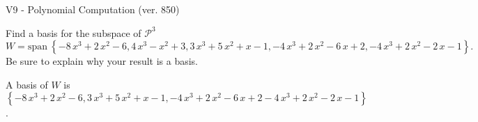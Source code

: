 \begin{exercise}
  \begin{exerciseTitle}V9 - Polynomial Computation (ver. 850)\end{exerciseTitle}
  \begin{exerciseStatement}
    Find a basis for the subspace of \(\mathcal{P}^3\) 
\[W=\mathrm{span}\ \left\{-8 \, x^{3} + 2 \, x^{2} - 6 , 4 \, x^{3} - x^{2} + 3 , 3 \, x^{3} + 5 \, x^{2} + x - 1 , -4 \, x^{3} + 2 \, x^{2} - 6 \, x + 2 , -4 \, x^{3} + 2 \, x^{2} - 2 \, x - 1\right\}.\]
 Be sure to explain why your result is a basis.


  \end{exerciseStatement}
  \begin{exerciseAnswer}
   A basis of \(W\) is  \(\left\{-8 \, x^{3} + 2 \, x^{2} - 6 , 3 \, x^{3} + 5 \, x^{2} + x - 1 , -4 \, x^{3} + 2 \, x^{2} - 6 \, x + 2 -4 \, x^{3} + 2 \, x^{2} - 2 \, x - 1\right\}\).
  


  \end{exerciseAnswer}
\end{exercise}